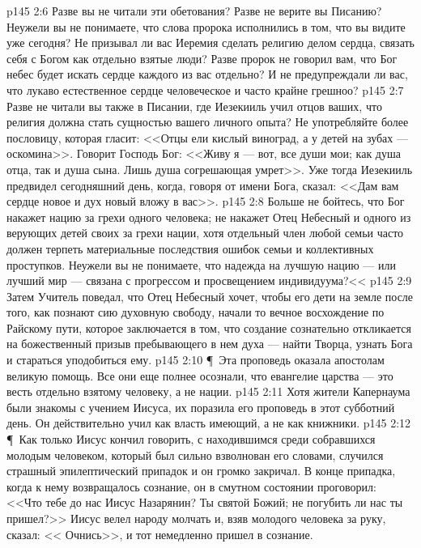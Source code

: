 \vs p145 2:6 Разве вы не читали эти обетования? Разве не верите вы Писанию? Неужели вы не понимаете, что слова пророка исполнились в том, что вы видите уже сегодня? Не призывал ли вас Иеремия сделать религию делом сердца, связать себя с Богом как отдельно взятые люди? Разве пророк не говорил вам, что Бог небес будет искать сердце каждого из вас отдельно? И не предупреждали ли вас, что лукаво естественное сердце человеческое и часто крайне грешноо?
\vs p145 2:7 Разве не читали вы также в Писании, где Иезекииль учил отцов ваших, что религия должна стать сущностью вашего личного опыта? Не употребляйте более пословицу, которая гласит: <<Отцы ели кислый виноград, а у детей на зубах --- оскомина>>. Говорит Господь Бог: <<Живу я --- вот, все души мои; как душа отца, так и душа сына. Лишь душа согрешающая умрет>>. Уже тогда Иезекииль предвидел сегодняшний день, когда, говоря от имени Бога, сказал: <<Дам вам сердце новое и дух новый вложу в вас>>.
\vs p145 2:8 Больше не бойтесь, что Бог накажет нацию за грехи одного человека; не накажет Отец Небесный и одного из верующих детей своих за грехи нации, хотя отдельный член любой семьи часто должен терпеть материальные последствия ошибок семьи и коллективных проступков. Неужели вы не понимаете, что надежда на лучшую нацию --- или лучший мир --- связана с прогрессом и просвещением индивидуума?<<
\vs p145 2:9 Затем Учитель поведал, что Отец Небесный хочет, чтобы его дети на земле после того, как познают сию духовную свободу, начали то вечное восхождение по Райскому пути, которое заключается в том, что создание сознательно откликается на божественный призыв пребывающего в нем духа --- найти Творца, узнать Бога и стараться уподобиться ему.
\vs p145 2:10 \P\ Эта проповедь оказала апостолам великую помощь. Все они еще полнее осознали, что евангелие царства --- это весть отдельно взятому человеку, а не нации.
\vs p145 2:11 Хотя жители Капернаума были знакомы с учением Иисуса, их поразила его проповедь в этот субботний день. Он действительно учил как власть имеющий, а не как книжники.
\vs p145 2:12 \P\ Как только Иисус кончил говорить, с находившимся среди собравшихся молодым человеком, который был сильно взволнован его словами, случился страшный эпилептический припадок и он громко закричал. В конце припадка, когда к нему возвращалось сознание, он в смутном состоянии проговорил: <<Что тебе до нас Иисус Назарянин? Ты святой Божий; не погубить ли нас ты пришел?>> Иисус велел народу молчать и, взяв молодого человека за руку, сказал: << Очнись>>, и тот немедленно пришел в сознание.

